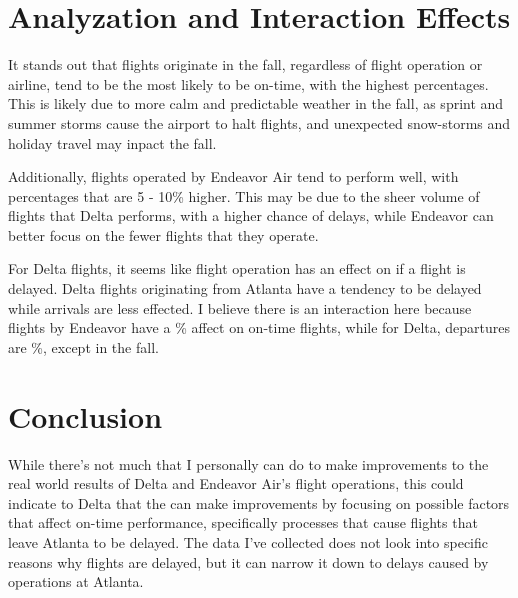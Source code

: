 \documentclass{article}
\begin{document}
  \section{Analyzation and Interaction Effects}

  It stands out that flights originate in the fall, regardless of flight
  operation or airline, tend to be the most likely to be on-time, with the
  highest percentages. This is likely due to more calm and predictable weather
  in the fall, as sprint and summer storms cause the airport to halt flights,
  and unexpected snow-storms and holiday travel may inpact the fall.
  
  Additionally, flights operated by Endeavor Air tend to perform well, with 
  percentages that are 5 - 10\% higher. This may be due to the sheer volume of
  flights that Delta performs, with a higher chance of delays, while Endeavor
  can better focus on the fewer flights that they operate.

  For Delta flights, it seems like flight operation has an effect on if a 
  flight is delayed. Delta flights originating from Atlanta have a tendency to
  be delayed while arrivals are less effected. I believe there is an 
  interaction here because flights by Endeavor have a \% affect on 
  on-time flights, while for Delta, departures are \%, except in the fall.

  \section{Conclusion}

  While there's not much that I personally can do to make improvements to the
  real world results of Delta and Endeavor Air's flight operations, this could
  indicate to Delta that the can make improvements by focusing on possible
  factors that affect on-time performance, specifically processes that cause
  flights that leave Atlanta to be delayed. The data I've collected does not
  look into specific reasons why flights are delayed, but it can narrow it down
  to delays caused by operations at Atlanta.
\end{document}
